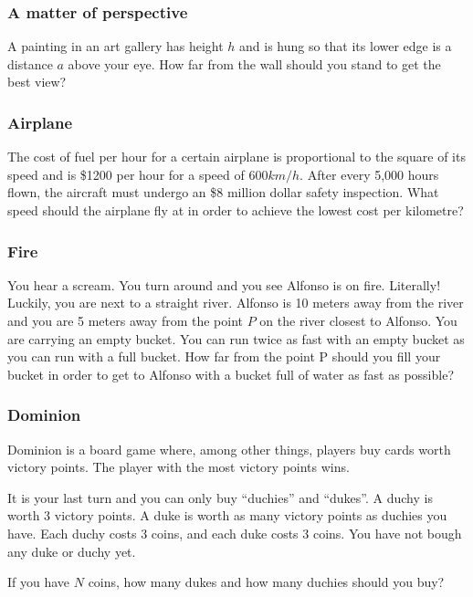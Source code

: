 \documentclass[14pt]{beamer}
\begin{document}
	\begin{frame}[t]
		\frametitle{A matter of perspective}

		A painting in an art gallery has height $h$ and is hung so that its lower
		edge is a distance $a$ above your eye. How far from the wall should you stand
		to get the best view?
	\end{frame}

	\begin{frame}[t]
		\frametitle{Airplane}

		The cost of fuel per hour for a certain airplane is proportional to the
		square of its speed and is \$1200 per hour for a speed of 600$km/h$. After every
		5,000 hours flown, the aircraft must undergo an \$8 million dollar safety inspection.
		What speed should the airplane fly at in order to achieve the lowest cost
		per kilometre?
	\end{frame}

	\begin{frame}[t]
		\frametitle{Fire}

		You hear a scream. You turn around and you see Alfonso is on fire. Literally!
		Luckily, you are next to a straight river. Alfonso is 10 meters away from the
		river and you are 5 meters away from the point $P$ on the river closest to Alfonso.
		You are carrying an empty bucket. You can run twice as fast with an empty bucket
		as you can run with a full bucket. How far from the point P should you fill
		your bucket in order to get to Alfonso with a bucket full of water as fast
		as possible?

	\end{frame}

	\begin{frame}[t]
		\frametitle{Dominion}

		Dominion is a board game where, among other things, players buy cards worth
		victory points. The player with the most victory points wins.

		It is your last turn and you can only buy ``duchies'' and ``dukes''. A duchy
		is worth 3 victory points. A duke is worth as many victory points as duchies
		you have. Each duchy costs 3 coins, and each duke costs 3 coins. You have
		not bough any duke or duchy yet.

		If you have $N$ coins, how many dukes and how many duchies should you buy?
	\end{frame}
\end{document}
